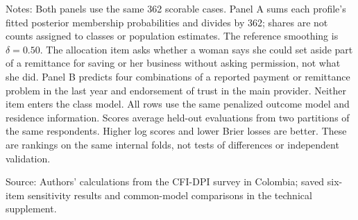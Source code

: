 \begin{table}[tbp]
\begin{minipage}{0.95\linewidth}
\begin{singlespace}
\smallskip
{\footnotesize\raggedright
Notes: Both panels use the same 362 scorable cases. Panel A sums each profile's fitted posterior membership probabilities and divides by 362; shares are not counts assigned to classes or population estimates. The reference smoothing is $\delta=0.50$. The allocation item asks whether a woman says she could set aside part of a remittance for saving or her business without asking permission, not what she did. Panel B predicts four combinations of a reported payment or remittance problem in the last year and endorsement of trust in the main provider. Neither item enters the class model. All rows use the same penalized outcome model and residence information. Scores average held-out evaluations from two partitions of the same respondents. Higher log scores and lower Brier losses are better. These are rankings on the same internal folds, not tests of differences or independent validation.\par
Source: Authors' calculations from the CFI-DPI survey in Colombia; saved six-item sensitivity results and common-model comparisons in the technical supplement.\par}
\end{singlespace}
\end{minipage}
\end{table}
